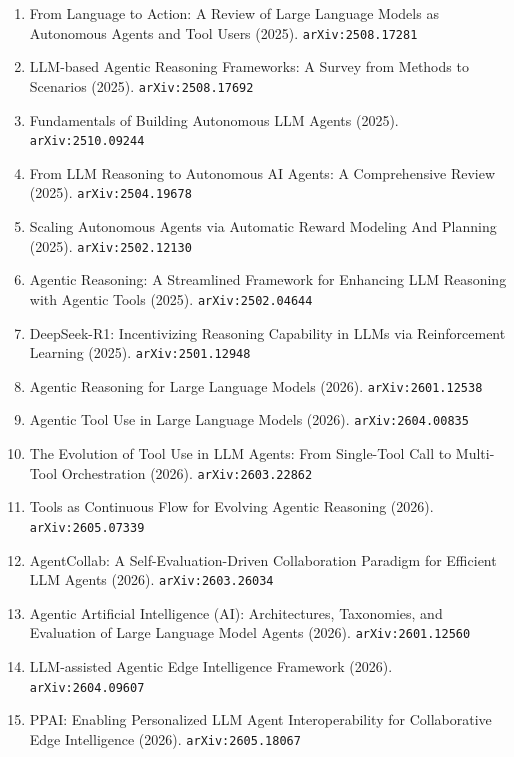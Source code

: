 \documentclass[11pt]{article}
\begin{document}
\begin{enumerate}
  Challenges (2025). \texttt{arXiv:2503.21460}
  \item From Language to Action: A Review of Large Language Models as Autonomous Agents and Tool Users (2025). \texttt{arXiv:2508.17281}
  \item LLM-based Agentic Reasoning Frameworks: A Survey from Methods to Scenarios (2025). \texttt{arXiv:2508.17692}
  \item Fundamentals of Building Autonomous LLM Agents (2025). \texttt{arXiv:2510.09244}
  \item From LLM Reasoning to Autonomous AI Agents: A Comprehensive Review (2025). \texttt{arXiv:2504.19678}
  \item Scaling Autonomous Agents via Automatic Reward Modeling And Planning (2025). \texttt{arXiv:2502.12130}
  \item Agentic Reasoning: A Streamlined Framework for Enhancing LLM Reasoning with Agentic Tools (2025). \texttt{arXiv:2502.04644}
  \item DeepSeek-R1: Incentivizing Reasoning Capability in LLMs via Reinforcement Learning (2025). \texttt{arXiv:2501.12948}
  \item Agentic Reasoning for Large Language Models (2026). \texttt{arXiv:2601.12538}
  \item Agentic Tool Use in Large Language Models (2026). \texttt{arXiv:2604.00835}
  \item The Evolution of Tool Use in LLM Agents: From Single-Tool Call to Multi-Tool Orchestration (2026). \texttt{arXiv:2603.22862}
  \item Tools as Continuous Flow for Evolving Agentic Reasoning (2026). \texttt{arXiv:2605.07339}
  \item AgentCollab: A Self-Evaluation-Driven Collaboration Paradigm for Efficient LLM Agents (2026). \texttt{arXiv:2603.26034}
  \item Agentic Artificial Intelligence (AI): Architectures, Taxonomies, and Evaluation of Large Language Model Agents (2026). \texttt{arXiv:2601.12560}
  \item LLM-assisted Agentic Edge Intelligence Framework (2026). \texttt{arXiv:2604.09607}
  \item PPAI: Enabling Personalized LLM Agent Interoperability for Collaborative Edge Intelligence (2026). \texttt{arXiv:2605.18067}
\end{enumerate}
\end{document}

